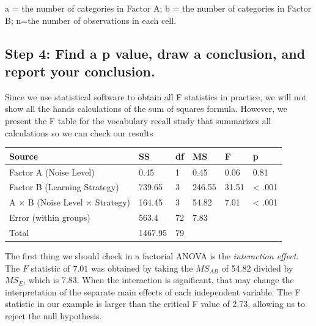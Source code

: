 \documentclass[
  letterpaper,
  DIV=11,
  numbers=noendperiod]{scrreprt}
\begin{document}
a = the number of categories in Factor A; b = the number of categories
in Factor B; n=the number of observations in each cell.

\subsection*{Step 4: Find a p value, draw a conclusion, and report your
conclusion.}\label{step-4-find-a-p-value-draw-a-conclusion-and-report-your-conclusion.}

Since we use statistical software to obtain all F statistics in
practice, we will not show all the hands calculations of the sum of
squares formula. However, we present the F table for the vocabulary
recall study that summarizes all calculations so we can check our
results

\begin{longtable}[]{@{}llllll@{}}
\toprule\noalign{}
Source & SS & df & MS & F & p \\
\midrule\noalign{}
\endhead
\bottomrule\noalign{}
\endlastfoot
Factor A (Noise Level) & 0.45 & 1 & 0.45 & 0.06 & 0.81 \\
Factor B (Learning Strategy) & 739.65 & 3 & 246.55 & 31.51 & \textless{}
.001 \\
A × B (Noise Level × Strategy) & 164.45 & 3 & 54.82 & 7.01 & \textless{}
.001 \\
Error (within groups) & 563.4 & 72 & 7.83 & & \\
Total & 1467.95 & 79 & & & \\
\end{longtable}

The first thing we should check in a factorial ANOVA is the
\emph{interaction effect}. The \(F\) statistic of \(7.01\) was obtained
by taking the \(MS_{AB}\) of 54.82 divided by \(MS_E\), which is 7.83.
When the interaction is significant, that may change the interpretation
of the separate main effects of each independent variable. The F
statistic in our example is larger than the critical F value of 2.73,
allowing us to reject the null hypothesis.
\end{document}
